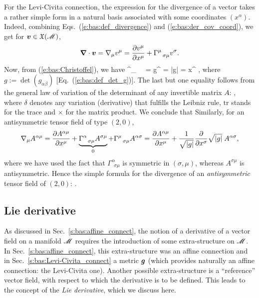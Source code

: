 For the Levi-Civita connection, the expression for the divergence of a vector takes
a rather simple form in a natural basis associated with some coordinates $(x^\alpha)$.
Indeed, combining Eqs.~(\ref{e:bas:def_divergence}) and (\ref{e:bas:der_cov_coord}),
we get for $\bm{v}\in\mathfrak{X}(\mathscr{M})$,
\[
  \bm{\nabla}\cdot\bm{v} = \nabla_\mu v^\mu = \frac{\partial v^\mu}{\partial x^\mu} + \Gamma^\mu_{\ \ \sigma\mu} v^\sigma   .
\]
Now, from (\ref{e:bas:Christoffel}),  we have
\be \label{e:bas:trGam_det_g}
  \Gamma^\mu_{\ \ \alpha\mu} =   g^{\mu\nu} 
  =   \ln|g|
  = \der{} {x^\alpha}  ,
\ee
where $g := \det(g_{\alpha\beta})$ [Eq.~(\ref{e:bas:def_det_g})].
The last but one equality follows from the general law of variation of the determinant of any
invertible matrix $A$:
\be \label{e:bas:variation_det}
     ,
\ee
where $\delta$ denotes any variation (derivative) that fulfills the Leibniz rule,
$\mathrm{tr}$ stands for the trace and $\times$ for the matrix product.
We conclude that
\be \label{e:bas:div_vect}
\ee
Similarly, for an antisymmetric tensor field of type $(2,0)$,
\[
   \nabla_\mu A^{\alpha\mu}
  = \frac{\partial A^{\alpha\mu}}{\partial x^\mu} +
  \underbrace{\Gamma^\alpha_{\ \ \sigma\mu} A^{\sigma\mu}}_{0}
  + \Gamma^\mu_{\ \ \sigma\mu} A^{\alpha\sigma}
  = \frac{\partial A^{\alpha\mu}}{\partial x^\mu} +  \frac{1}{\sqrt{|g|}}\frac{\partial }{\partial x^\sigma} \sqrt{|g|}
  \;  A^{\alpha\sigma} ,
\]
where we have used the fact that $\Gamma^\alpha_{\ \ \sigma\mu}$ is symmetric in
$(\sigma,\mu)$, whereas $A^{\sigma\mu}$ is antisymmetric.
Hence the simple formula for the divergence of an \emph{antisymmetric} tensor field
of $(2,0)$:
\be \label{e:bas:div_antisym}
   .
\ee


\subsection{Lie derivative} \label{s:bas:Lie}

As discussed in Sec.~\ref{s:bas:affine_connect}, the notion of a derivative of a vector field on a manifold $\mathscr{M}$
requires the introduction of some extra-structure on $\mathscr{M}$.
In Sec.~\ref{s:bas:affine_connect}, this extra-structure was an affine connection
and in Sec.~\ref{s:bas:Levi-Civita_connect} a metric
$\bm{g}$ (which provides naturally an affine connection: the Levi-Civita one).
Another possible extra-structure is a ``reference''
vector field, with respect to which the derivative is to be defined. This leads to the
concept of the \emph{Lie derivative}, which we discuss here.


